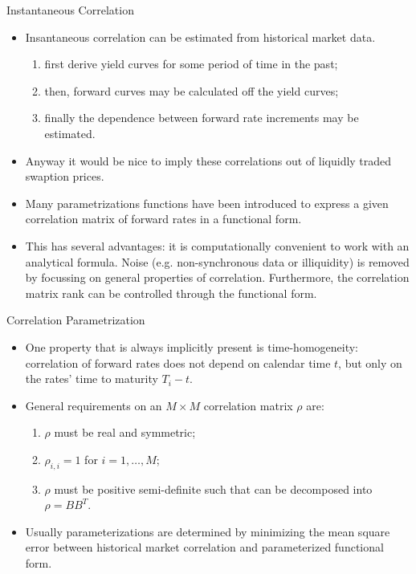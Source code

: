 \documentclass{beamer}
\begin{document}
\begin{frame}{Instantaneous Correlation}
  \begin{itemize}    
  \item<1-> Insantaneous correlation can be estimated from historical market data.
  \begin{enumerate}
	  \item first derive yield curves for some period of time in the past;
	  \item then, forward curves may be calculated off the yield curves;
	  \item finally the dependence between forward rate increments may be estimated. 
  \end{enumerate}
  \item<2-> Anyway it would be nice to imply these correlations out of liquidly traded swaption prices. 
  \item<3-> Many parametrizations functions have been introduced to express a given correlation matrix of forward rates in a functional form.
  \item<4-> This has several advantages: it is computationally convenient to work with an analytical formula. Noise (e.g. non-synchronous data or illiquidity) is removed by focussing on general properties of correlation. Furthermore, the correlation matrix rank can be controlled through the functional form.
  \end{itemize}
\end{frame}

\begin{frame}{Correlation Parametrization}
  \begin{itemize}
  \item One property that is always implicitly present is time-homogeneity: correlation of forward rates does not depend on calendar time $t$, but only on the rates’ time to maturity $T_i-t$.
  \item General requirements on an $M \times M$ correlation matrix $\rho$ are:
	\begin{enumerate}
		\item $\rho$ must be real and symmetric;
		\item $\rho_{i,i}=1$ for $i = 1,\ldots, M$;
		\item $\rho$ must be positive semi-definite such that can be decomposed into $\rho = BB^T$.
	\end{enumerate}
	\item Usually parameterizations are determined by minimizing the mean square error between historical market correlation and parameterized functional form.
	\end{itemize}
\end{frame}
\end{document}
